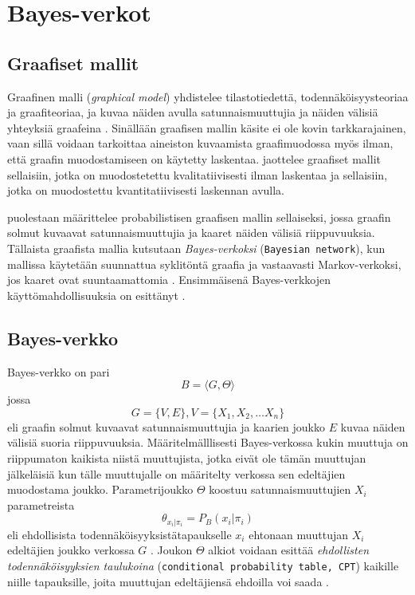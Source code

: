 \chapter{Bayes-verkot\label{bayes}}

\section{Graafiset mallit}
Graafinen malli (\emph{graphical model}) yhdistelee tilastotiedettä, todennäköisyysteoriaa ja graafiteoriaa, ja kuvaa näiden avulla satunnaismuuttujia ja näiden välisiä yhteyksiä graafeina \citep{jordan_graphical_2004}. Sinällään graafisen mallin käsite ei ole kovin tarkkarajainen, vaan sillä voidaan tarkoittaa aineiston kuvaamista graafimuodossa myös ilman, että graafin muodostamiseen on käytetty laskentaa. \citet{ramsahai_connecting_2020} jaottelee graafiset mallit sellaisiin, jotka on muodostetettu kvalitatiivisesti ilman laskentaa ja sellaisiin, jotka on muodostettu kvantitatiivisesti laskennan avulla. 

\citet{jordan_graphical_2004} puolestaan määrittelee probabilistisen graafisen mallin sellaiseksi, jossa graafin solmut kuvaavat satunnaismuuttujia ja kaaret näiden välisiä riippuvuuksia. Tällaista graafista mallia kutsutaan \emph{Bayes-verkoksi} (\texttt{Bayesian network}), kun mallissa käytetään suunnattua syklitöntä graafia ja vastaavasti Markov-verkoksi, jos kaaret ovat suuntaamattomia \citep{ruggeri_bayesian_2008}. Ensimmäisenä Bayes-verkkojen käyttömahdollisuuksia on esittänyt \citet{pearl1986fusion}.

\section{Bayes-verkko}
Bayes-verkko on pari 
$$
    B = \langle G, \Theta \rangle
$$
jossa 
$$
    G = \{V, E\}, V = \{X_1, X_2,\ldots X_n\}
$$ 
eli graafin solmut kuvaavat satunnaismuuttujia ja kaarien joukko $E$ kuvaa näiden välisiä suoria riippuvuuksia. Määritelmälllisesti Bayes-verkossa kukin muuttuja on riippumaton kaikista niistä muuttujista, jotka eivät ole tämän muuttujan jälkeläisiä kun tälle muuttujalle on määritelty verkossa sen edeltäjien muodostama joukko. Parametrijoukko $\Theta$ koostuu satunnaismuuttujien $X_i$ parametreista 
$$
    \theta_{x_i|\pi_i} = P_B(x_i|\pi_i)
$$ 
eli ehdollisista todennäköisyyksistätapaukselle $x_i$ ehtonaan muuttujan $X_i$ edeltäjien joukko verkossa $G$ \citep{ruggeri_bayesian_2008, myllymaki_bayes-verkkojen_1998}. Joukon $\Theta$ alkiot voidaan esittää \emph{ehdollisten todennäköisyyksien taulukoina}  (\texttt{conditional probability table, CPT}) kaikille niille tapauksille, joita muuttujan edeltäjiensä ehdoilla voi saada \citep{zhang_brief_2019}.


